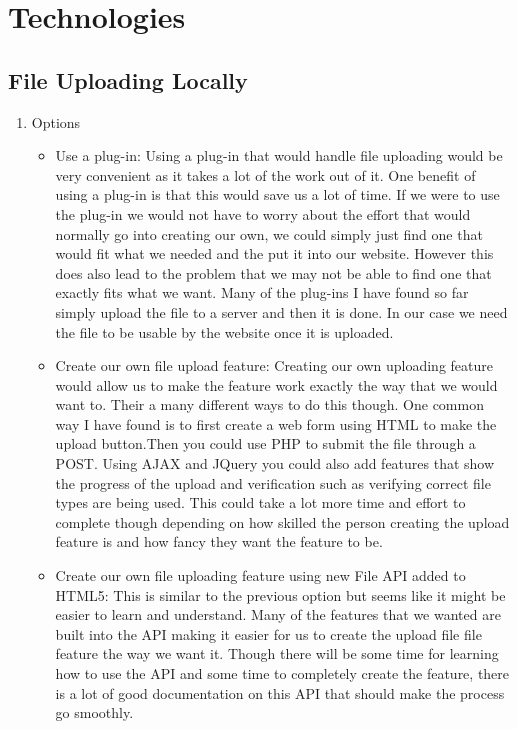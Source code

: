 \documentclass[letterpaper, 10pt, draftclsnofoot, compsoc, onecolumn]{IEEEtran}
\begin{document}
\section{Technologies}

	\subsection{File Uploading Locally}
		\begin{enumerate}
			\item{Options}
				\begin{itemize}
					\item  Use a plug-in: Using a plug-in that would handle file uploading would be very convenient as it takes a lot
						of the work out of it. One benefit of using a plug-in is that this would save us a lot of time. If we were to use
						the plug-in we would not have to worry about the effort that would normally go into creating our own, we could simply just
						find one that would fit  what we needed and the put it into our website. However this does also lead to the problem that we
						may not be able to find one that exactly fits what we want. Many of the plug-ins I have found so far simply upload the file to
						a server and then it is done. In our case we need the file to be usable by the website once it is uploaded.
 
					\item  Create our own file upload feature: Creating our own uploading feature would allow us to make the feature 
						work exactly the way that we would want to. Their a many different ways to do this though. One common way I have found 
						is to first create a web form using HTML to make the upload button.Then you could use PHP to submit the file through a POST.
						Using AJAX and JQuery you could also add features that show the progress of the upload and verification such as verifying correct 
						file types are being used. This could take a lot more time and effort to complete though depending on how skilled the person creating 
						the upload feature is and how fancy they want the feature to be.      

					\item  Create our own file uploading feature using new File API added to HTML5: This is similar to the previous option but seems like it might 
						be easier to learn and understand. Many of the features that we wanted are built into the API making it easier for us to create the 
						upload file file feature the way we want it. Though there will be some time for learning how to use the API and some time to completely
						create the feature, there is a lot of good documentation on this API that should make the process go smoothly.  


\end{itemize}
\end{enumerate}
\end{document}
